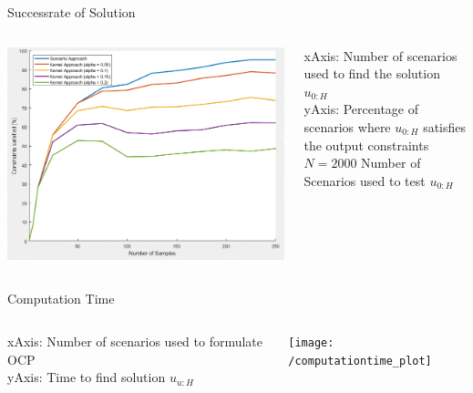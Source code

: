 \documentclass[student, noshadow, lsr, english, aspectratio=169]{ITR_LSR_slides}
\begin{document}
\begin{frame}{Successrate of Solution}
	\vspace{.2cm}
	\begin{columns}[onlytextwidth, T]
		\begin{column}{.5\textwidth}
			\includegraphics[width=.9\textwidth]{robustness_plot}
		\end{column}
		\begin{column}{.5\textwidth}
			xAxis: Number of scenarios used to find the solution $u_{0:H}$ \\
			\vspace{.1cm}yAxis: Percentage of scenarios where $u_{0:H}$ satisfies the output constraints \\
			\vspace{.4cm}$N = 2000$ Number of Scenarios used to test $u_{0:H}$
		\end{column}
	\end{columns}\vspace{.5cm}
\end{frame}	

\begin{frame}{Computation Time}
\vspace{.2cm}
\begin{columns}[onlytextwidth, T]
		\begin{column}{.5\textwidth}
			\vspace{.4cm}
			xAxis: Number of scenarios used to formulate OCP \\
			\vspace{.2cm}yAxis: Time to find solution $u_{u:H}$ \\
		\end{column}
		\begin{column}{.5\textwidth}
			\texttt{[image: /computationtime\_plot]}
		\end{column}
	\end{columns}\vspace{.5cm}
\end{frame}	
\end{document}
